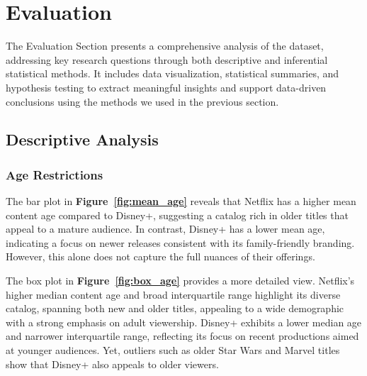 \documentclass[a4paper, 12pt]{article}
\begin{document}

\section{Evaluation}

The Evaluation Section presents a comprehensive analysis of the dataset, addressing key research questions through both descriptive and inferential statistical methods. It includes data visualization, statistical summaries, and hypothesis testing to extract meaningful insights and support data-driven conclusions using the methods we used in the previous section.

\subsection{Descriptive Analysis}
\subsubsection{Age Restrictions}

The bar plot in \textbf{Figure~\ref{fig:mean_age}} reveals that Netflix has a higher mean content age compared to Disney+, suggesting a catalog rich in older titles that appeal to a mature audience. In contrast, Disney+ has a lower mean age, indicating a focus on newer releases consistent with its family-friendly branding. However, this alone does not capture the full nuances of their offerings.

The box plot in \textbf{Figure~\ref{fig:box_age}} provides a more detailed view. Netflix's higher median content age and broad interquartile range highlight its diverse catalog, spanning both new and older titles, appealing to a wide demographic with a strong emphasis on adult viewership. Disney+ exhibits a lower median age and narrower interquartile range, reflecting its focus on recent productions aimed at younger audiences. Yet, outliers such as older Star Wars and Marvel titles show that Disney+ also appeals to older viewers.
\end{document}
